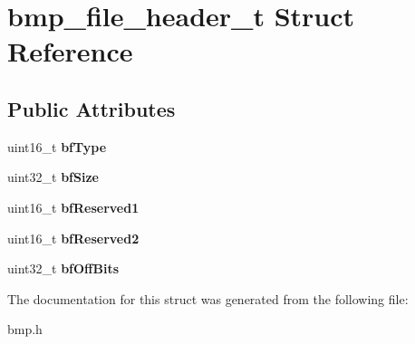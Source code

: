 \hypertarget{structbmp__file__header__t}{}\section{bmp\+\_\+file\+\_\+header\+\_\+t Struct Reference}
\label{structbmp__file__header__t}
\subsection*{Public Attributes}
\begin{DoxyCompactItemize}
\item 
\hypertarget{structbmp__file__header__t_ad56fdc571c8cec81d4aafe26cf3268e1}{}\label{structbmp__file__header__t_ad56fdc571c8cec81d4aafe26cf3268e1} 
uint16\+\_\+t {\bfseries bf\+Type}
\item 
\hypertarget{structbmp__file__header__t_a04356e25c69092296298f7c75b702ccf}{}\label{structbmp__file__header__t_a04356e25c69092296298f7c75b702ccf} 
uint32\+\_\+t {\bfseries bf\+Size}
\item 
\hypertarget{structbmp__file__header__t_a808540b5418bb1ebac96b0b4952a06d7}{}\label{structbmp__file__header__t_a808540b5418bb1ebac96b0b4952a06d7} 
uint16\+\_\+t {\bfseries bf\+Reserved1}
\item 
\hypertarget{structbmp__file__header__t_aa65980f45734a4d9eba0878b97623499}{}\label{structbmp__file__header__t_aa65980f45734a4d9eba0878b97623499} 
uint16\+\_\+t {\bfseries bf\+Reserved2}
\item 
\hypertarget{structbmp__file__header__t_ae84a9b8d975c2183f92f9a758514a6ae}{}\label{structbmp__file__header__t_ae84a9b8d975c2183f92f9a758514a6ae} 
uint32\+\_\+t {\bfseries bf\+Off\+Bits}
\end{DoxyCompactItemize}


The documentation for this struct was generated from the following file\+:\begin{DoxyCompactItemize}
\item 
bmp.\+h\end{DoxyCompactItemize}
